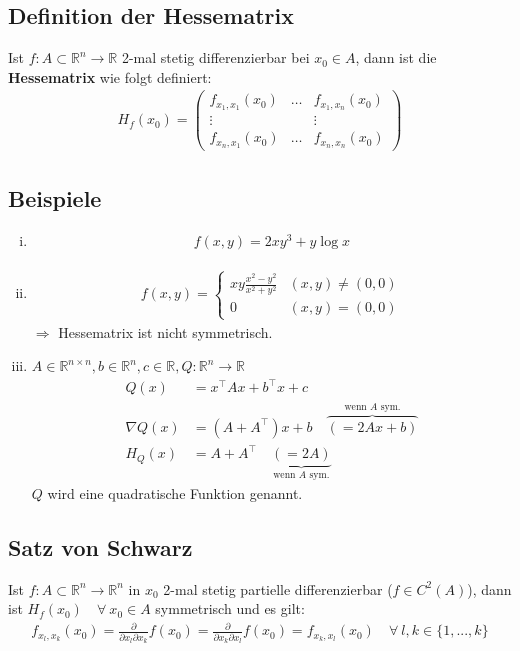 \documentclass[11pt,a4paper]{book}
\newcommand {\R}	{\mathbb{R}}
\newcommand {\Rn}	{\mathbb{R}^n}
\newcommand {\Rnxn}	{\mathbb{R}^{n \times n}}
\newcommand{\1}    	{\mathbbm{1}}
\begin{document}
\subsection{Definition der Hessematrix}
Ist \(f : A \subset \Rn \rightarrow \R\) 2-mal stetig differenzierbar bei \(x_0 \in A\), dann ist die \textbf{Hessematrix} wie folgt definiert:
\begin{align*}
	H_f(x_0) = \left( \begin{array}{ccc}
		f_{x_1,x_1} (x_0) & \hdots & f_{x_1,x_n} (x_0) \\
		\vdots & & \vdots \\
		f_{x_n,x_1} (x_0) & \hdots & f_{x_n,x_n} (x_0)
	\end{array} \right)
\end{align*}

\subsection{Beispiele}
\begin{enumerate}[(i)]
	\item \begin{align*}
		f(x,y) = 2xy^3 + y \log x
	\end{align*}
	\item \begin{align*}
		f(x,y) = \left\{ \begin{array}{ll}
			xy \frac{x^2 - y^2}{x^2 + y^2} & (x,y) \neq (0,0) \\
			0 & (x,y) = (0,0)
		\end{array} \right.
	\end{align*}
	\(\Rightarrow\) Hessematrix ist nicht symmetrisch.
	\item \(A \in \Rnxn, b \in \Rn, c \in \R, Q : \Rn \rightarrow \R\)
	\begin{align*}
		Q(x) &= x^\top A x + b^\top x + c \\
		\nabla Q(x) &= \left( A + A^\top \right)x + b \quad \overbrace{( =  2Ax + b)}^{\textrm{wenn }A\textrm{ sym.}} \\
		H_Q(x) &= A + A^\top \quad \underbrace{( = 2A)}_{\textrm{wenn }A\textrm{ sym.}}
	\end{align*}
	\(Q\) wird eine quadratische Funktion genannt.
\end{enumerate}

\subsection{Satz von Schwarz}
Ist \(f : A \subset \Rn \rightarrow \Rn\) in \(x_0\) 2-mal stetig partielle differenzierbar (\(f \in C^2(A)\)), dann ist \(H_f(x_0) \quad \forall~ x_0 \in A\) symmetrisch und es gilt:
\begin{align*}
	f_{x_l, x_k} (x_0) = \frac{\partial}{\partial x_l \partial x_k} f(x_0) = \frac{\partial}{\partial x_k \partial x_l} f(x_0) = f_{x_k, x_l} (x_0) \quad \forall~ l,k \in \{ 1, ..., k \}
\end{align*}
\end{document}

